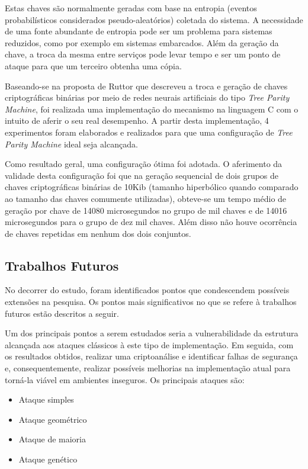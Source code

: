 \documentclass[a4paper,10pt,oneside,conference,final,keeplastbox]{inatel}
\begin{document}
        Estas chaves são normalmente geradas com base na entropia (eventos probabilísticos considerados pseudo-aleatórios) coletada do sistema. A necessidade de uma fonte abundante de entropia pode ser um problema para sistemas reduzidos, como por exemplo em sistemas embarcados. Além da geração da chave, a troca da mesma entre serviços pode levar tempo e ser um ponto de ataque para que um terceiro obtenha uma cópia.
        
        Baseando-se na proposta de Ruttor \cite{ruttor2007neural} que descreveu a troca e geração de chaves criptográficas binárias por meio de redes neurais artificiais do tipo \textit{Tree Parity Machine}, foi realizada uma implementação do mecanismo na linguagem C com o intuito de aferir o seu real desempenho. A partir desta implementação, 4 experimentos foram elaborados e realizados para que uma configuração de \textit{Tree Parity Machine} ideal seja alcançada.
        
        Como resultado geral, uma configuração ótima foi adotada. O aferimento da validade desta configuração foi que na geração sequencial de dois grupos de chaves criptográficas binárias de 10Kib (tamanho hiperbólico quando comparado ao tamanho das chaves comumente utilizadas), obteve-se um tempo médio de geração por chave de 14080 microsegundos no grupo de mil chaves e de 14016 microsegundos para o grupo de dez mil chaves. Além disso não houve ocorrência de chaves repetidas em nenhum dos dois conjuntos.
        

        \subsection{Trabalhos Futuros}
        \label{subsec:trabalhosFuturos}

            No decorrer do estudo, foram identificados pontos que condescendem possíveis extensões na pesquisa. Os pontos mais significativos no que se refere à trabalhos futuros estão descritos a seguir.

            Um dos principais pontos a serem estudados seria a vulnerabilidade da estrutura alcançada aos ataques clássicos à este tipo de implementação. Em seguida, com os resultados obtidos, realizar uma criptoanálise e identificar falhas de segurança e, consequentemente, realizar possíveis melhorias na implementação atual para torná-la viável em ambientes inseguros. Os principais ataques são:
            \begin{itemize}
                \item Ataque simples \cite{ruttor2006genetic}
                \item Ataque geométrico \cite{klimov2002analysis}
                \item Ataque de maioria \cite{ruttor2007neural}
                \item Ataque genético \cite{ruttor2006genetic}\cite{klimov2002analysis}
            \end{itemize}
\end{document}
